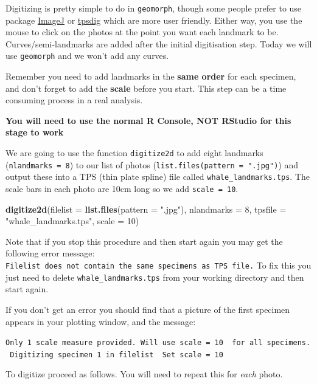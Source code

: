 \documentclass[]{book}
\newenvironment{Shaded}{\begin{snugshade}}{\end{snugshade}}
\newcommand{\KeywordTok}[1]{\textcolor[rgb]{0.13,0.29,0.53}{\textbf{{#1}}}}
\newcommand{\DataTypeTok}[1]{\textcolor[rgb]{0.13,0.29,0.53}{{#1}}}
\newcommand{\DecValTok}[1]{\textcolor[rgb]{0.00,0.00,0.81}{{#1}}}
\newcommand{\StringTok}[1]{\textcolor[rgb]{0.31,0.60,0.02}{{#1}}}
\newcommand{\NormalTok}[1]{{#1}}
\begin{document}
Digitizing is pretty simple to do in \texttt{geomorph}, though some
people prefer to use package
\href{https://imagej.nih.gov/ij/download.html}{ImageJ} or
\href{http://life.bio.sunysb.edu/morph/soft-dataacq.html}{tpsdig} which
are more user friendly. Either way, you use the mouse to click on the
photos at the point you want each landmark to be. Curves/semi-landmarks
are added after the initial digitisation step. Today we will use
\texttt{geomorph} and we won't add any curves.

Remember you need to add landmarks in the \textbf{same order} for each
specimen, and don't forget to add the \textbf{scale} before you start.
This step can be a time consuming process in a real analysis.

\textbf{You will need to use the normal R Console, NOT RStudio for this
stage to work}

We are going to use the function \texttt{digitize2d} to add eight
landmarks (\texttt{nlandmarks\ =\ 8}) to our list of photos
(\texttt{list.files(pattern\ =\ ".jpg")}) and output these into a TPS
(thin plate spline) file called \texttt{whale\_landmarks.tps}. The scale
bars in each photo are 10cm long so we add \texttt{scale\ =\ 10}.

\begin{Shaded}
\begin{Highlighting}[]
\KeywordTok{digitize2d}\NormalTok{(}\DataTypeTok{filelist =} \KeywordTok{list.files}\NormalTok{(}\DataTypeTok{pattern =} \StringTok{".jpg"}\NormalTok{),}
           \DataTypeTok{nlandmarks =} \DecValTok{8}\NormalTok{, }\DataTypeTok{tpsfile =} \StringTok{"whale_landmarks.tps"}\NormalTok{, }\DataTypeTok{scale =} \DecValTok{10}\NormalTok{)}
\end{Highlighting}
\end{Shaded}

Note that if you stop this procedure and then start again you may get
the following error message:
\texttt{Filelist\ does\ not\ contain\ the\ same\ specimens\ as\ TPS\ file.}
To fix this you just need to delete \texttt{whale\_landmarks.tps} from
your working directory and then start again.

If you don't get an error you should find that a picture of the first
specimen appears in your plotting window, and the message:

\texttt{Only\ 1\ scale\ measure\ provided.\ Will\ use\ scale\ =\ 10\ \ for\ all\ specimens.\ Digitizing\ specimen\ 1\ in\ filelist\ \ Set\ scale\ =\ 10}

To digitize proceed as follows. You will need to repeat this for
\emph{each} photo.
\end{document}
